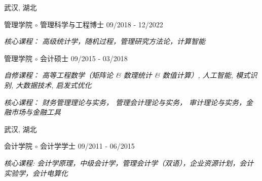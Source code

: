 \vspace{-6.0mm}

\begin{cventries}
\vspace{-1.5mm}
\cveducation
{}
{武汉, 湖北}

\cvsubeducation
{管理学院 $\circ$ 管理科学与工程博士}
{09/2018 - 12/2022}
{
    \begin{cvitems}
    \item {\itshape{核心课程： 高级统计学，随机过程，管理研究方法论，计算智能}}
    \end{cvitems}
}
\vspace{-1.0mm}

\cvsubeducation
{管理学院 $\circ$ 会计硕士}
{09/2015 - 03/2018}
{
    \begin{cvitems}
    \item {\itshape{自修课程： 高等工程数学（矩阵论 \& 数理统计 \& 数值计算）, 人工智能, 模式识别, 大数据技术, 启发式优化}}
    \item {\itshape{核心课程： 财务管理理论与实务， 管理会计理论与实务， 审计理论与实务，金融市场与金融工具}}
    \end{cvitems}
}

\cveducation
{}
{武汉, 湖北}

\cvsubeducation
{会计学院 $\circ$  会计学学士}
{09/2011 - 06/2015}
{
    \begin{cvitems}
    \item {\itshape{核心课程: 会计学原理，中级会计学，管理会计学（双语），企业资源计划，会计实验学，会计电算化}}
    \end{cvitems}
}
\end{cventries}